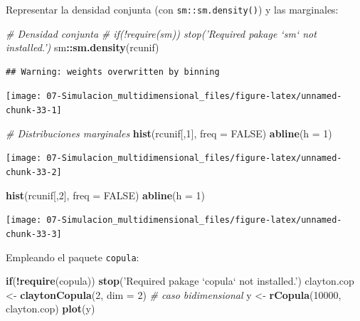 \documentclass[]{book}
\newenvironment{Shaded}{\begin{snugshade}}{\end{snugshade}}
\newcommand{\KeywordTok}[1]{\textcolor[rgb]{0.13,0.29,0.53}{\textbf{#1}}}
\newcommand{\DataTypeTok}[1]{\textcolor[rgb]{0.13,0.29,0.53}{#1}}
\newcommand{\DecValTok}[1]{\textcolor[rgb]{0.00,0.00,0.81}{#1}}
\newcommand{\StringTok}[1]{\textcolor[rgb]{0.31,0.60,0.02}{#1}}
\newcommand{\CommentTok}[1]{\textcolor[rgb]{0.56,0.35,0.01}{\textit{#1}}}
\newcommand{\OtherTok}[1]{\textcolor[rgb]{0.56,0.35,0.01}{#1}}
\newcommand{\ControlFlowTok}[1]{\textcolor[rgb]{0.13,0.29,0.53}{\textbf{#1}}}
\newcommand{\OperatorTok}[1]{\textcolor[rgb]{0.81,0.36,0.00}{\textbf{#1}}}
\newcommand{\NormalTok}[1]{#1}
\theoremstyle{definition}
\theoremstyle{definition}
\theoremstyle{definition}
\theoremstyle{remark}
\begin{document}
\begin{enumerate}
  Representar la densidad conjunta (con \texttt{sm::sm.density()}) y las
  marginales:

\begin{Shaded}
\begin{Highlighting}[]
\CommentTok{# Densidad conjunta}
\CommentTok{# if(!require(sm)) stop('Required pakage `sm` not installed.')}
\NormalTok{sm}\OperatorTok{::}\KeywordTok{sm.density}\NormalTok{(rcunif)}
\end{Highlighting}
\end{Shaded}

\begin{verbatim}
## Warning: weights overwritten by binning
\end{verbatim}

  \begin{center}\texttt{[image: 07-Simulacion\_multidimensional\_files/figure-latex/unnamed-chunk-33-1]} \end{center}

\begin{Shaded}
\begin{Highlighting}[]
\CommentTok{# Distribuciones marginales}
\KeywordTok{hist}\NormalTok{(rcunif[,}\DecValTok{1}\NormalTok{], }\DataTypeTok{freq =} \OtherTok{FALSE}\NormalTok{)}
\KeywordTok{abline}\NormalTok{(}\DataTypeTok{h =} \DecValTok{1}\NormalTok{)}
\end{Highlighting}
\end{Shaded}

  \begin{center}\texttt{[image: 07-Simulacion\_multidimensional\_files/figure-latex/unnamed-chunk-33-2]} \end{center}

\begin{Shaded}
\begin{Highlighting}[]
\KeywordTok{hist}\NormalTok{(rcunif[,}\DecValTok{2}\NormalTok{], }\DataTypeTok{freq =} \OtherTok{FALSE}\NormalTok{)}
\KeywordTok{abline}\NormalTok{(}\DataTypeTok{h =} \DecValTok{1}\NormalTok{)}
\end{Highlighting}
\end{Shaded}

  \begin{center}\texttt{[image: 07-Simulacion\_multidimensional\_files/figure-latex/unnamed-chunk-33-3]} \end{center}

  Empleando el paquete \texttt{copula}:

\begin{Shaded}
\begin{Highlighting}[]
\ControlFlowTok{if}\NormalTok{(}\OperatorTok{!}\KeywordTok{require}\NormalTok{(copula)) }\KeywordTok{stop}\NormalTok{(}\StringTok{'Required pakage `copula` not installed.'}\NormalTok{)}
\NormalTok{clayton.cop <-}\StringTok{ }\KeywordTok{claytonCopula}\NormalTok{(}\DecValTok{2}\NormalTok{, }\DataTypeTok{dim =} \DecValTok{2}\NormalTok{) }\CommentTok{# caso bidimensional}
\NormalTok{y <-}\StringTok{ }\KeywordTok{rCopula}\NormalTok{(}\DecValTok{10000}\NormalTok{, clayton.cop)}
\KeywordTok{plot}\NormalTok{(y)}
\end{Highlighting}
\end{Shaded}


\end{enumerate}
\end{document}
